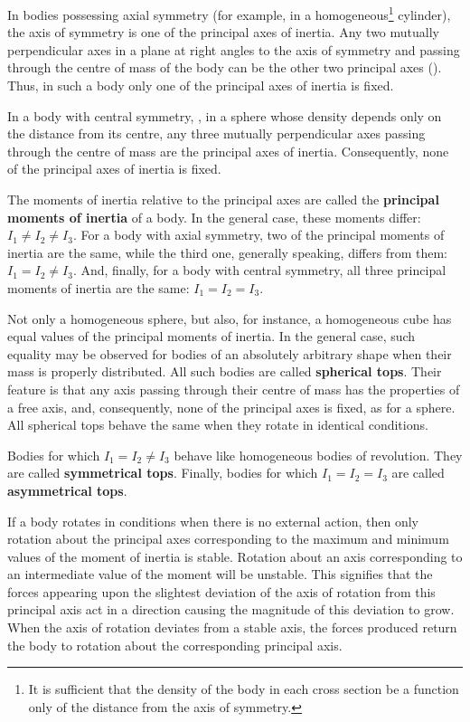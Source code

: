 In bodies possessing axial symmetry (for example, in a homogeneous\footnote{It is sufficient that the density of the body in each cross section be a function only of the distance from the axis of symmetry.} cylinder), the axis of symmetry is one of the principal axes of inertia. Any two mutually perpendicular axes in a plane at right angles to the axis of symmetry and passing through the centre of mass of the body can be the other two principal axes (). Thus, in such a body only one of the principal axes of inertia is fixed.

In a body with central symmetry, \ie, in a sphere whose density depends only on the distance from its centre, any three mutually perpendicular axes passing through the centre of mass are the principal axes of inertia. Consequently, none of the principal axes of inertia is fixed.

The moments of inertia relative to the principal axes are called the \textbf{principal moments of inertia} of a body. In the general case, these moments differ: $I_1\neq I_2\neq I_3$. For a body with axial symmetry, two of the principal moments of inertia are the same, while the third one, generally speaking, differs from them: $I_1=I_2\neq I_3$. And, finally, for a body with central symmetry, all three principal moments of inertia are the same: $I_1=I_2=I_3$.

Not only a homogeneous sphere, but also, for instance, a homogeneous cube has equal values of the principal moments of inertia. In the general case, such equality may be observed for bodies of an absolutely arbitrary shape when their mass is properly distributed. All such bodies are called \textbf{spherical tops}. Their feature is that any axis passing through their centre of mass has the properties of a free axis, and, consequently, none of the principal axes is fixed, as for a sphere. All spherical tops behave the same when they rotate in identical conditions.

Bodies for which $I_1=I_2\neq I_3$ behave like homogeneous bodies of revolution. They are called \textbf{symmetrical tops}. Finally, bodies for which $I_1=I_2=I_3$ are called \textbf{asymmetrical tops}.

If a body rotates in conditions when there is no external action, then only rotation about the principal axes corresponding to the maximum and minimum values of the moment of inertia is stable. Rotation about an axis corresponding to an intermediate value of the moment will be unstable. This signifies that the forces appearing upon the slightest deviation of the axis of rotation from this principal axis act in a direction causing the magnitude of this deviation to grow. When the axis of rotation deviates from a stable axis, the forces produced return the body to rotation about the corresponding principal axis.


